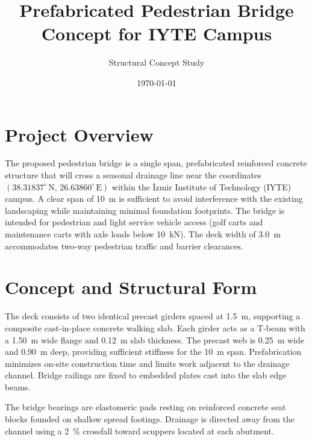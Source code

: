 \documentclass[12pt,a4paper]{report}
\title{Prefabricated Pedestrian Bridge Concept for IYTE Campus}
\author{Structural Concept Study}
\date{\today}
\begin{document}
\maketitle

\section{Project Overview}
The proposed pedestrian bridge is a single span, prefabricated reinforced concrete structure that will cross a seasonal drainage line near the coordinates $(38.31837^{\circ}\,\mathrm{N},\,26.63860^{\circ}\,\mathrm{E})$ within the İzmir Institute of Technology (IYTE) campus. A clear span of \SI{10}{\meter} is sufficient to avoid interference with the existing landscaping while maintaining minimal foundation footprints. The bridge is intended for pedestrian and light service vehicle access (golf carts and maintenance carts with axle loads below \SI{10}{\kilo\newton}). The deck width of \SI{3.0}{\meter} accommodates two-way pedestrian traffic and barrier clearances.

\section{Concept and Structural Form}
The deck consists of two identical precast girders spaced at \SI{1.5}{\meter}, supporting a composite cast-in-place concrete walking slab. Each girder acts as a T-beam with a \SI{1.50}{\meter} wide flange and \SI{0.12}{\meter} slab thickness. The precast web is \SI{0.25}{\meter} wide and \SI{0.90}{\meter} deep, providing sufficient stiffness for the \SI{10}{\meter} span. Prefabrication minimizes on-site construction time and limits work adjacent to the drainage channel. Bridge railings are fixed to embedded plates cast into the slab edge beams.

The bridge bearings are elastomeric pads resting on reinforced concrete seat blocks founded on shallow spread footings. Drainage is directed away from the channel using a \SI{2}{\percent} crossfall toward scuppers located at each abutment.
\end{document}
